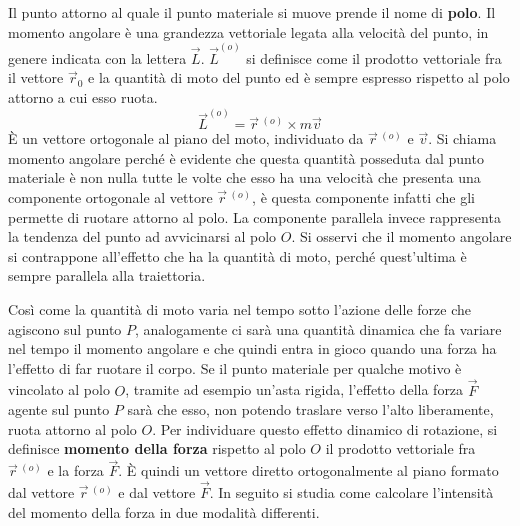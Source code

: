 \documentclass[10pt,a4paper]{book}
\begin{document}
\FloatBarrier
\vspace*{-2cm}
Il punto attorno al quale il punto materiale si muove prende il nome di \textbf{polo}. Il momento angolare è una grandezza vettoriale legata alla velocità del punto, in genere indicata con la lettera $\vec{L}$.
$\vec{L}^{(o)}$ si definisce come il prodotto vettoriale fra il vettore $\vec{r}_0$ e la quantità di moto del punto ed è sempre espresso rispetto al polo attorno a cui esso ruota.
\[
	\boxed{\vec{L}^{(o)}=\vec{r}\,^{(o)}\times m\vec{v}}
\]
È un vettore ortogonale al piano del moto, individuato da $\vec{r}\,^{(o)}$ e $\vec{v}$. Si chiama momento angolare perché è evidente che questa quantità posseduta dal punto materiale è non nulla tutte le volte che esso ha una velocità che presenta una componente ortogonale al vettore $\vec{r}\,^{(o)}$, è questa componente infatti che gli permette di ruotare attorno al polo. La componente parallela invece rappresenta la tendenza del punto ad avvicinarsi al polo $O$. Si osservi che il momento angolare si contrappone all'effetto che ha la quantità di moto, perché quest'ultima è sempre parallela alla traiettoria.

Così come la quantità di moto varia nel tempo sotto l'azione delle forze che agiscono sul punto $P$, analogamente ci sarà una quantità dinamica che fa variare nel tempo il momento angolare e che quindi entra in gioco quando una forza ha l'effetto di far ruotare il corpo. Se il punto materiale per qualche motivo è vincolato al polo $O$, tramite ad esempio un'asta rigida, l'effetto della forza $\vec{F}$ agente sul punto $P$ sarà che esso, non potendo traslare verso l'alto liberamente, ruota attorno al polo $O$. Per individuare questo effetto dinamico di rotazione, si definisce \textbf{momento della forza} rispetto al polo $O$ il prodotto vettoriale fra $\vec{r}\,^{(o)}$ e la forza $\vec{F}$. È quindi un vettore diretto ortogonalmente al piano formato dal vettore $\vec{r}\,^{(o)}$ e dal vettore $\vec{F}$. In seguito si studia come calcolare l'intensità del momento della forza in due modalità differenti.
\end{document}
